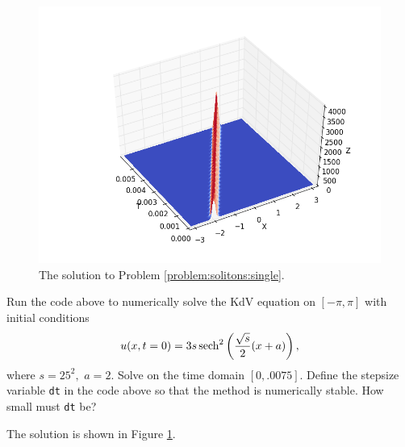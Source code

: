 % 
% 
% 
% 
\begin{figure}
\centering
\includegraphics[width=\textwidth]{soliton.png}
\caption{The solution to Problem \ref{problem:solitons:single}.}
\label{fig:solitons:single}
\end{figure}


\begin{problem}
Run the code above to numerically solve the KdV equation on $[-\pi,\pi]$ with initial conditions 
\[
u(x,t=0) = 3s\operatorname{sech}^2\left(\frac{\sqrt{s}}{2}(x+a)\right),
\]
where $s = 25^2,$ $a = 2$. Solve on the time domain $[0,.0075]$. Define the stepsize variable {\tt dt} in the code above so that the method is numerically stable.  How small must {\tt dt} be? 

The solution is shown in Figure \ref{fig:solitons:single}.
\label{problem:solitons:single}
\end{problem}


